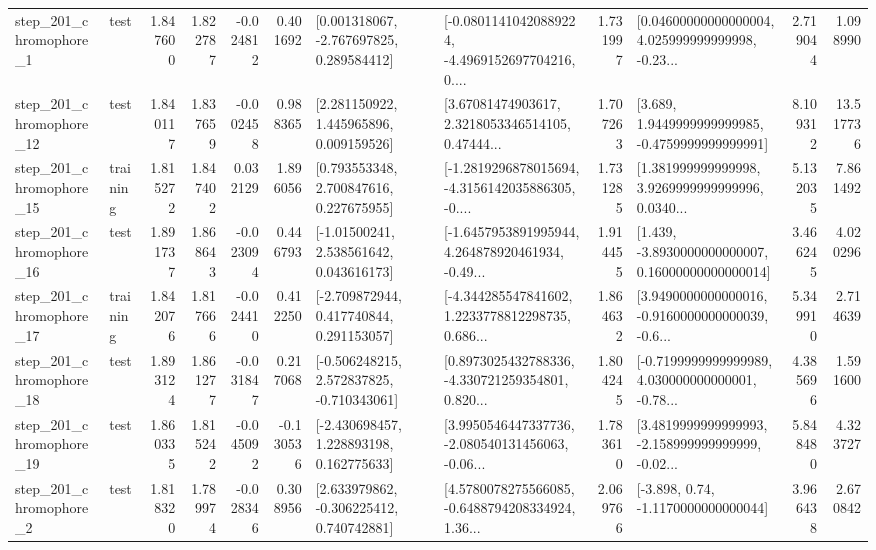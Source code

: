 \begin{tabular}{llrrrrllrlrr}
   step\_201\_chromophore\_1 &      test &      1.847600 &    1.822787 &     -0.024812 &  0.401692 &    [0.001318067, -2.767697825, 0.289584412] &  [-0.08011410420889224, -4.4969152697704216, 0.... &       1.731997 &  [0.04600000000000004, 4.025999999999998, -0.23... &            2.719044 &          1.098990 \\
  step\_201\_chromophore\_12 &      test &      1.840117 &    1.837659 &     -0.002458 &  0.988365 &     [2.281150922, 1.445965896, 0.009159526] &  [3.67081474903617, 2.3218053346514105, 0.47444... &       1.707263 &   [3.689, 1.9449999999999985, -0.4759999999999991] &            8.109312 &         13.517736 \\
  step\_201\_chromophore\_15 &  training &      1.815272 &    1.847402 &      0.032129 &  1.896056 &     [0.793553348, 2.700847616, 0.227675955] &  [-1.2819296878015694, -4.3156142035886305, -0.... &       1.731285 &  [1.381999999999998, 3.9269999999999996, 0.0340... &            5.132035 &          7.861492 \\
  step\_201\_chromophore\_16 &      test &      1.891737 &    1.868643 &     -0.023094 &  0.446793 &     [-1.01500241, 2.538561642, 0.043616173] &  [-1.6457953891995944, 4.264878920461934, -0.49... &       1.914455 &  [1.439, -3.8930000000000007, 0.16000000000000014] &            3.466245 &          4.020296 \\
  step\_201\_chromophore\_17 &  training &      1.842076 &    1.817666 &     -0.024410 &  0.412250 &    [-2.709872944, 0.417740844, 0.291153057] &  [-4.344285547841602, 1.2233778812298735, 0.686... &       1.864632 &  [3.9490000000000016, -0.9160000000000039, -0.6... &            5.349910 &          2.714639 \\
  step\_201\_chromophore\_18 &      test &      1.893124 &    1.861277 &     -0.031847 &  0.217068 &   [-0.506248215, 2.572837825, -0.710343061] &  [0.8973025432788336, -4.330721259354801, 0.820... &       1.804245 &  [-0.7199999999999989, 4.030000000000001, -0.78... &            4.385696 &          1.591600 \\
  step\_201\_chromophore\_19 &      test &      1.860335 &    1.815242 &     -0.045092 & -0.130536 &    [-2.430698457, 1.228893198, 0.162775633] &  [3.9950546447337736, -2.080540131456063, -0.06... &       1.783610 &  [3.4819999999999993, -2.158999999999999, -0.02... &            5.848480 &          4.323727 \\
   step\_201\_chromophore\_2 &      test &      1.818320 &    1.789974 &     -0.028346 &  0.308956 &    [2.633979862, -0.306225412, 0.740742881] &  [4.5780078275566085, -0.6488794208334924, 1.36... &       2.069766 &                [-3.898, 0.74, -1.1170000000000044] &            3.966438 &          2.670842 \\

\end{tabular}
